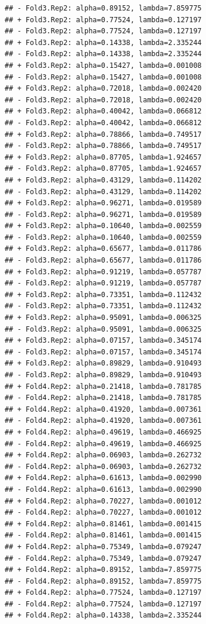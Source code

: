 \documentclass[
]{article}
\begin{document}
\begin{verbatim}
## - Fold3.Rep2: alpha=0.89152, lambda=7.859775 
## + Fold3.Rep2: alpha=0.77524, lambda=0.127197 
## - Fold3.Rep2: alpha=0.77524, lambda=0.127197 
## + Fold3.Rep2: alpha=0.14338, lambda=2.335244 
## - Fold3.Rep2: alpha=0.14338, lambda=2.335244 
## + Fold3.Rep2: alpha=0.15427, lambda=0.001008 
## - Fold3.Rep2: alpha=0.15427, lambda=0.001008 
## + Fold3.Rep2: alpha=0.72018, lambda=0.002420 
## - Fold3.Rep2: alpha=0.72018, lambda=0.002420 
## + Fold3.Rep2: alpha=0.40042, lambda=0.066812 
## - Fold3.Rep2: alpha=0.40042, lambda=0.066812 
## + Fold3.Rep2: alpha=0.78866, lambda=0.749517 
## - Fold3.Rep2: alpha=0.78866, lambda=0.749517 
## + Fold3.Rep2: alpha=0.87705, lambda=1.924657 
## - Fold3.Rep2: alpha=0.87705, lambda=1.924657 
## + Fold3.Rep2: alpha=0.43129, lambda=0.114202 
## - Fold3.Rep2: alpha=0.43129, lambda=0.114202 
## + Fold3.Rep2: alpha=0.96271, lambda=0.019589 
## - Fold3.Rep2: alpha=0.96271, lambda=0.019589 
## + Fold3.Rep2: alpha=0.10640, lambda=0.002559 
## - Fold3.Rep2: alpha=0.10640, lambda=0.002559 
## + Fold3.Rep2: alpha=0.65677, lambda=0.011786 
## - Fold3.Rep2: alpha=0.65677, lambda=0.011786 
## + Fold3.Rep2: alpha=0.91219, lambda=0.057787 
## - Fold3.Rep2: alpha=0.91219, lambda=0.057787 
## + Fold3.Rep2: alpha=0.73351, lambda=0.112432 
## - Fold3.Rep2: alpha=0.73351, lambda=0.112432 
## + Fold3.Rep2: alpha=0.95091, lambda=0.006325 
## - Fold3.Rep2: alpha=0.95091, lambda=0.006325 
## + Fold3.Rep2: alpha=0.07157, lambda=0.345174 
## - Fold3.Rep2: alpha=0.07157, lambda=0.345174 
## + Fold3.Rep2: alpha=0.89829, lambda=0.910493 
## - Fold3.Rep2: alpha=0.89829, lambda=0.910493 
## + Fold4.Rep2: alpha=0.21418, lambda=0.781785 
## - Fold4.Rep2: alpha=0.21418, lambda=0.781785 
## + Fold4.Rep2: alpha=0.41920, lambda=0.007361 
## - Fold4.Rep2: alpha=0.41920, lambda=0.007361 
## + Fold4.Rep2: alpha=0.49619, lambda=0.466925 
## - Fold4.Rep2: alpha=0.49619, lambda=0.466925 
## + Fold4.Rep2: alpha=0.06903, lambda=0.262732 
## - Fold4.Rep2: alpha=0.06903, lambda=0.262732 
## + Fold4.Rep2: alpha=0.61613, lambda=0.002990 
## - Fold4.Rep2: alpha=0.61613, lambda=0.002990 
## + Fold4.Rep2: alpha=0.70227, lambda=0.001012 
## - Fold4.Rep2: alpha=0.70227, lambda=0.001012 
## + Fold4.Rep2: alpha=0.81461, lambda=0.001415 
## - Fold4.Rep2: alpha=0.81461, lambda=0.001415 
## + Fold4.Rep2: alpha=0.75349, lambda=0.079247 
## - Fold4.Rep2: alpha=0.75349, lambda=0.079247 
## + Fold4.Rep2: alpha=0.89152, lambda=7.859775 
## - Fold4.Rep2: alpha=0.89152, lambda=7.859775 
## + Fold4.Rep2: alpha=0.77524, lambda=0.127197 
## - Fold4.Rep2: alpha=0.77524, lambda=0.127197 
## + Fold4.Rep2: alpha=0.14338, lambda=2.335244 

\end{verbatim}
\end{document}

